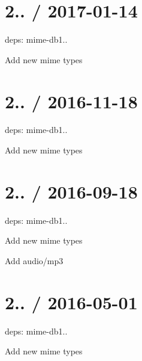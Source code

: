 \section*{2.. / 2017-\/01-\/14 }


\begin{DoxyItemize}
\item deps\+: mime-\/db1..
\begin{DoxyItemize}
\item Add new mime types
\end{DoxyItemize}
\end{DoxyItemize}

\section*{2.. / 2016-\/11-\/18 }


\begin{DoxyItemize}
\item deps\+: mime-\/db1..
\begin{DoxyItemize}
\item Add new mime types
\end{DoxyItemize}
\end{DoxyItemize}

\section*{2.. / 2016-\/09-\/18 }


\begin{DoxyItemize}
\item deps\+: mime-\/db1..
\begin{DoxyItemize}
\item Add new mime types
\item Add {\ttfamily audio/mp3}
\end{DoxyItemize}
\end{DoxyItemize}

\section*{2.. / 2016-\/05-\/01 }


\begin{DoxyItemize}
\item deps\+: mime-\/db1..
\begin{DoxyItemize}
\item Add new mime types
\end{DoxyItemize}
\end{DoxyItemize}

